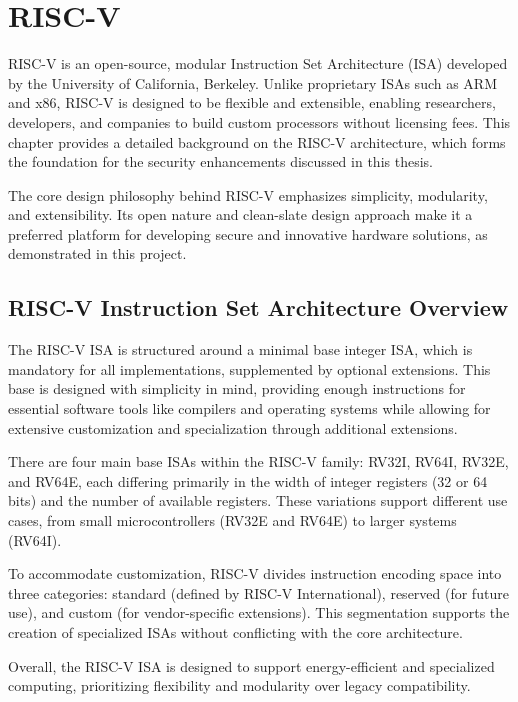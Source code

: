 \chapter{RISC-V}
\label{cha:riscv}

RISC-V is an open-source, modular Instruction Set Architecture (ISA) developed by
the University of California, Berkeley\cite{riscv}. Unlike proprietary ISAs such
as ARM and x86, RISC-V is designed to be flexible and extensible, enabling
researchers, developers, and companies to build custom processors without
licensing fees. This chapter provides a detailed background on the RISC-V architecture,
which forms the foundation for the security enhancements discussed in this
thesis.

The core design philosophy behind RISC-V emphasizes simplicity, modularity, and
extensibility. Its open nature and clean-slate design approach make it a preferred
platform for developing secure and innovative hardware solutions, as
demonstrated in this project.

\section{RISC-V Instruction Set Architecture Overview}
\label{sec:riscv_isa}

The RISC-V ISA is structured around a minimal base integer ISA, which is
mandatory for all implementations, supplemented by optional extensions. This
base is designed with simplicity in mind, providing enough instructions for essential
software tools like compilers and operating systems while allowing for extensive
customization and specialization through additional extensions.

There are four main base ISAs within the RISC-V family: RV32I, RV64I, RV32E, and
RV64E, each differing primarily in the width of integer registers (32 or 64 bits)
and the number of available registers. These variations support different use cases,
from small microcontrollers (RV32E and RV64E) to larger systems (RV64I).

To accommodate customization, RISC-V divides instruction encoding space into three
categories: standard (defined by RISC-V International), reserved (for future use),
and custom (for vendor-specific extensions). This segmentation supports the creation
of specialized ISAs without conflicting with the core architecture.

Overall, the RISC-V ISA is designed to support energy-efficient and specialized
computing, prioritizing flexibility and modularity over legacy compatibility.

